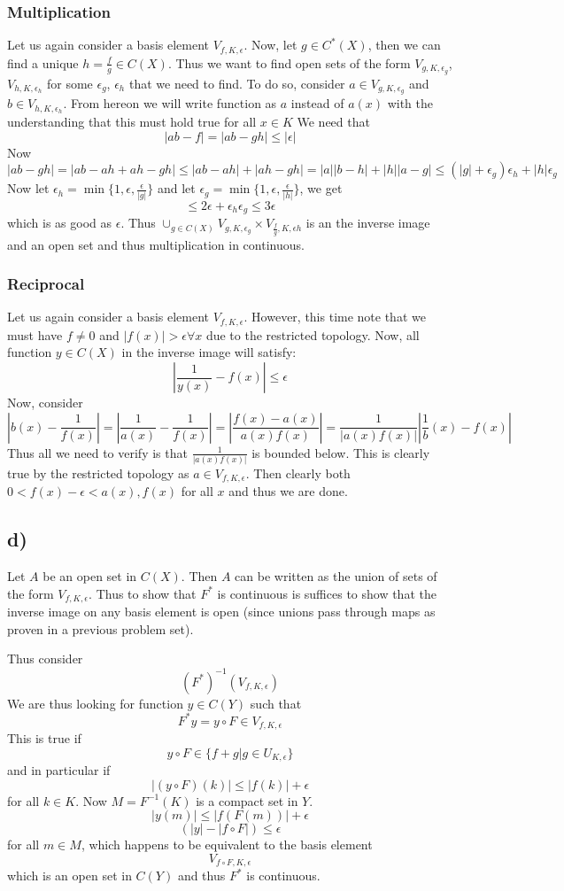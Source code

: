 \subsubsection*{Multiplication}
Let us again consider a basis element $V_{f,K,\epsilon}$. 
Now, let $g\in C^*(X)$, then we can find a unique $h=\frac{f}{g} \in C(X)$. Thus we want to find open sets of the form $V_{g,K,\epsilon_g}$, $V_{h,K,\epsilon_h}$ for some $\epsilon_g$, $\epsilon_h$ that we need to find. To do so, consider $a\in V_{g,K,\epsilon_g}$ and $b\in V_{h,K,\epsilon_h}$. From hereon we will write function as $a$ instead of $a(x)$ with the understanding that this must hold true for all $x\in K$ We need that 
\[ |ab - f| = |ab-gh| \leq |\epsilon| \]
Now 
\[ |ab - gh| = |ab - ah + ah - gh| \leq |ab - ah| + |ah-gh| = |a||b-h| + |h||a-g| \leq (|g|+\epsilon_g)\epsilon_h + |h| \epsilon_g \]
Now let $\epsilon_h = \min \{1, \epsilon, \frac{\epsilon}{|g|} \}$ and let $\epsilon_g = \min \{1, \epsilon, \frac{\epsilon}{|h|} \}$, we get
\[ \leq 2\epsilon + \epsilon_h\epsilon_g \leq 3\epsilon \]
which is as good as $\epsilon$.
Thus $\cup_{g\in C(X)} V_{g,K,\epsilon_g}\times V_{\frac{f}{g},K,\epsilon{h}}$ is an the inverse image and an open set and thus multiplication in continuous.
\subsubsection*{Reciprocal}
Let us again consider a basis element $V_{f,K,\epsilon}$. However, this time note that we must have $f\neq 0$ and $|f(x)|> \epsilon \forall x$ due to the restricted topology. 
Now, all function $y\in C(X)$ in the inverse image will satisfy:
\[ |\frac{1}{y(x)}-f(x)| \leq \epsilon \]
Now, consider
\[ \left| b(x) - \frac{1}{f(x)} \right| = \left| \frac{1}{a(x)} - \frac{1}{f(x)} \right| = \left|\frac{f(x) - a(x)}{a(x)f(x)} 
\right| = \frac{1}{|a(x)f(x)|}\left|\frac{1}{b} (x) - f(x)\right| \]
Thus all we need to verify is that $\frac{1}{|a(x)f(x)|}$ is bounded below. This is clearly true by the restricted topology as $a\in V_{f,K,\epsilon}$. Then clearly both $0 < f(x)-\epsilon < a(x), f(x)$ for all $x$ and thus we are done.
\subsection*{d)}
Let $A$ be an open set in $C(X)$. Then $A$ can be written as the union of sets of the form $V_{f,K,\epsilon}$. Thus to show that $F^*$ is continuous is suffices to show that the inverse image on any basis element is open (since unions pass through maps as proven in a previous problem set). \par
Thus consider
\[ (F^*)^{-1}(V_{f,K,\epsilon}) \]
We are thus looking for function $y\in C(Y)$ such that
\[ F^* y = y\circ F \in  V_{f,K,\epsilon} \]
This is true if
\[ y\circ F \in \{ f+g| g\in U_{K,\epsilon} \}\]
and in particular if
\[ |(y\circ F)(k)| \leq |f(k)|+\epsilon \]
for all $k\in K$. Now $M=F^{-1}(K)$ is a compact set in $Y$. 
\[ |y(m)| \leq |f(F(m))| + \epsilon \] 
\[ (|y|-|f\circ F|) \leq \epsilon \]
for all $m\in M$,
which happens to be equivalent to the basis element 
\[ V_{f\circ F, K, \epsilon} \] 
which is an open set in $C(Y)$ and thus $F^*$ is continuous. 
